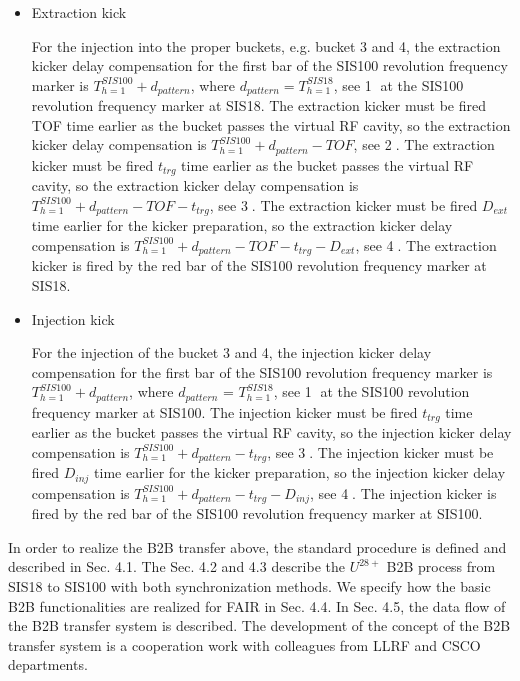 \begin{itemize}
\item Extraction kick

For the injection into the proper buckets, e.g. bucket 3 and 4, the extraction kicker delay compensation for the first bar of the SIS100 revolution frequency marker is $T_{h=1}^{SIS100} + d_{pattern}$, where $d_{pattern} = T_{h=1}^{SIS18}$, see \textcircled{1} at the SIS100 revolution frequency marker at SIS18. The extraction kicker must be fired TOF time earlier as the bucket passes the virtual RF cavity, so the extraction kicker delay compensation is $T_{h=1}^{SIS100} + d_{pattern} - TOF$, see \textcircled{2}. The extraction kicker must be fired $t_{trg}$ time earlier as the bucket passes the virtual RF cavity, so the extraction kicker delay compensation is $T_{h=1}^{SIS100} + d_{pattern} - TOF - t_{trg}$, see \textcircled{3}. The extraction kicker must be fired $D_{ext}$ time earlier for the kicker preparation, so the extraction kicker delay compensation is $T_{h=1}^{SIS100} + d_{pattern} - TOF - t_{trg} - D_{ext}$, see \textcircled{4}. The extraction kicker is fired by the red bar of the SIS100 revolution frequency marker at SIS18.

\item Injection kick

For the injection of the bucket 3 and 4, the injection kicker delay compensation for the first bar of the SIS100 revolution frequency marker is $T_{h=1}^{SIS100} + d_{pattern}$, where $d_{pattern}$ = $T_{h=1}^{SIS18}$, see \textcircled{1} at the SIS100 revolution frequency marker at SIS100. The injection kicker  must be fired $t_{trg}$ time earlier as the bucket passes the virtual RF cavity, so the injection kicker delay compensation is $T_{h=1}^{SIS100} + d_{pattern} -  t_{trg}$, see \textcircled{3}. The injection kicker must be fired $D_{inj}$ time earlier for the kicker preparation, so the injection kicker delay compensation is $T_{h=1}^{SIS100} + d_{pattern} - t_{trg} - D_{inj}$, see \textcircled{4}. The injection kicker is fired by the red bar of the SIS100 revolution frequency marker at SIS100.
\end{itemize}

In order to realize the B2B transfer above, the standard procedure is defined and described in Sec. 4.1. The Sec. 4.2 and 4.3 describe the $U^{28+}$ B2B process from SIS18 to SIS100 with both synchronization methods. We specify how the basic B2B functionalities are realized for FAIR in Sec. 4.4. In Sec. 4.5, the data flow of the B2B transfer system is described. The development of the concept of the B2B transfer system is a cooperation work with colleagues from LLRF and \gls{CSCO} departments. 
